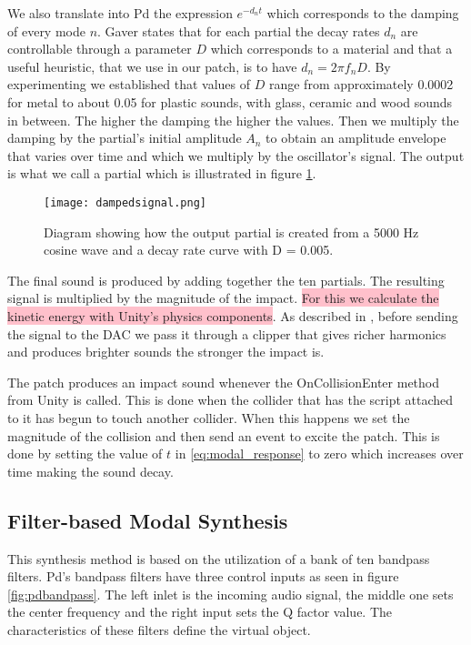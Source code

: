 We also translate into Pd the expression $e^{-d_n t}$ which corresponds to the damping of every mode $n$. Gaver \cite{gaver1993we} states that for each partial the decay rates $d_n$ are controllable through a parameter $D$ which corresponds to a material and that a useful heuristic, that we use in our patch, is to have $d_n = 2 \pi f_nD$. By experimenting we established that values of $D$ range from approximately 0.0002 for metal to about 0.05 for plastic sounds, with glass, ceramic and wood sounds in between. The higher the damping the higher the values. Then we multiply the damping by the partial's initial amplitude $A_n$ to obtain an amplitude envelope that varies over time and which we multiply by the oscillator's signal. The output is what we call a partial which is illustrated in figure \ref{fig:dampedsignal}. 

\begin{figure}[H]
  \centering
    \texttt{[image: dampedsignal.png]}
      \caption{Diagram showing how the output partial is created from a 5000 Hz cosine wave and a decay rate curve with D = 0.005.}
      \label{fig:dampedsignal}
\end{figure}

The final sound is produced by adding together the ten partials. The resulting signal is multiplied by the magnitude of the impact. \colorbox{pink}{For this we calculate the kinetic energy with Unity's physics components}. As described in \cite{farnell2010designing}, before sending the signal to the DAC we pass it through a clipper that gives richer harmonics and produces brighter sounds the stronger the impact is.

The patch produces an impact sound whenever the OnCollisionEnter method from Unity is called. This is done when the collider that has the script attached to it has begun to touch another collider. When this happens we set the magnitude of the collision and then send an event to excite the patch. This is done by setting the value of $t$ in \ref{eq:modal_response} to zero which increases over time making the sound decay.

\subsection{Filter-based Modal Synthesis}

This synthesis method is based on the utilization of a bank of ten bandpass filters. Pd's bandpass filters have three control inputs as seen in figure \ref{fig:pdbandpass}. The left inlet is the incoming audio signal, the middle one sets the center frequency and the right input sets the Q factor value. The characteristics of these filters define the virtual object.


